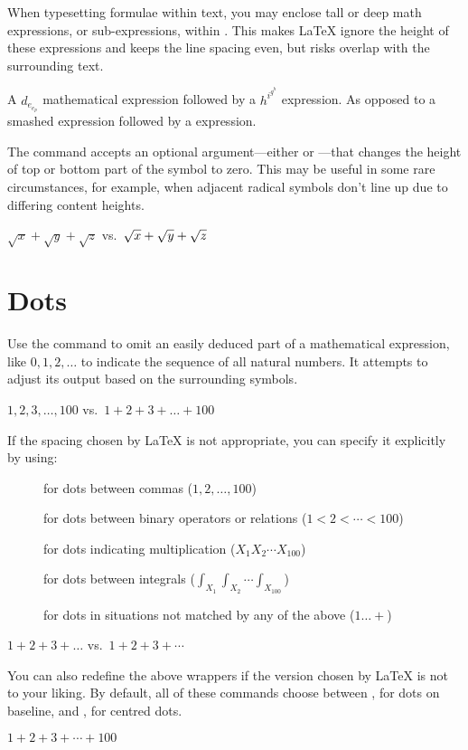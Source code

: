 When typesetting formulae within text, you may enclose tall or deep math
expressions, or sub-expressions, within . This makes \LaTeX{} ignore
the height of these expressions and keeps the line spacing even, but risks
overlap with the surrounding text.
\begin{example}
A \(d_{e_{e_p}}\) mathematical
expression followed by a
\(h^{i^{g^h}}\) expression.
As opposed to a smashed
expression followed by a
expression.
\end{example}

The  command accepts an optional argument---either  or
---that changes the height of top or bottom part of the symbol to
zero. This may be useful in some rare circumstances, for example, when adjacent
radical symbols don't line up due to differing content heights.
\begin{example}
\(  \sqrt{x}
  + \sqrt{y}
  + \sqrt{z}\)
vs.\
\(  \sqrt{x}
  + \sqrt{\smash[b]{y}}
  + \sqrt{z} \)
\end{example}

\section{Dots}

Use the  command to omit an easily deduced part of a mathematical
expression, like \(0, 1, 2, \dots\) to indicate the sequence of all natural
numbers. It attempts to adjust its output based on the surrounding symbols.
\begin{example}
\(1, 2, 3, \dots, 100\) vs.\
\(1 + 2 + 3 + \dots + 100\)
\end{example}

If the spacing chosen by \LaTeX{} is not appropriate, you can specify it
explicitly by using:
\begin{description}
  \item[] for dots between commas (\(1, 2, \dotsc, 100\))
  \item[\csi{dotsb}] for dots between binary operators or relations (\(1 < 2 <
    \dotsb < 100\))
  \item[\csi{dotsm}] for dots indicating multiplication (\(X_1 X_2 \dotsm
    X_{100}\))
  \item[\csi{dotsi}] for dots between integrals (\(\int_{X_1}\int_{X_2}
    \dotsi \int_{X_{100}}\))
  \item[\csi{dotso}] for dots in situations not matched by any of the above
    (\(1\dotso+\))
\end{description}
\begin{example}
\(1 + 2 + 3 + \dots\) vs.\
\(1 + 2 + 3 + \dotsb\)
\end{example}
You can also redefine the above wrappers if the version chosen by \LaTeX{} is
not to your liking. By default, all of these commands choose between
\csi{ldots}, for dots on baseline, and , for centred dots.
\begin{example}
\RenewDocumentCommand{%
  \dotsb}{}{\ldots}
\( 1 + 2 + 3 + \dotsb + 100 \)
\end{example}

